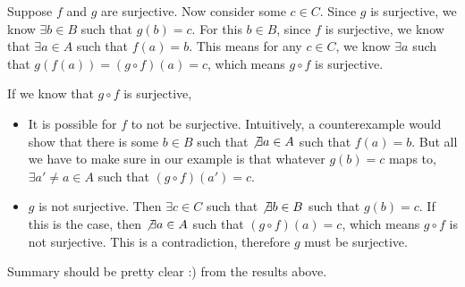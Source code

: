 {{    \item Suppose $f$ and $g$ are surjective. Now consider some $c \in C$.
    Since $g$ is surjective, we know $\exists b \in B$ such that $g(b) = c$.
    For this $b \in B$, since $f$ is surjective, we know that $\exists a \in A$
    such that $f(a) = b$.
    This means for any $c \in C$, we know $\exists a$ such that $g(f(a)) = (g
    \circ f)(a) = c$, which means $g \circ f$ is surjective.

    \item If we know that $g \circ f$ is surjective,
    \begin{itemize}
      \item It is possible for $f$ to not be surjective. Intuitively, a
      counterexample would show that there is some $b \in B$ such that
      $\not\exists a \in A$ such that $f(a) = b$. But all we have to make sure
      in our example is that whatever $g(b) = c$ maps to, $\exists a' \neq a \in
      A$ such that $(g \circ f)(a') = c$.

      \item \AFSOC $g$ is not surjective. Then $\exists c \in C$ such that
      $\not\exists b \in B$ such that $g(b) = c$. If this is the case, then
      $\not\exists a \in A$ such that $(g \circ f)(a) = c$, which means $g \circ
      f$ is not surjective. This is a contradiction, therefore $g$ must be
      surjective.
    \end{itemize}

    \item Summary should be pretty clear :) from the results above.
  }
}

